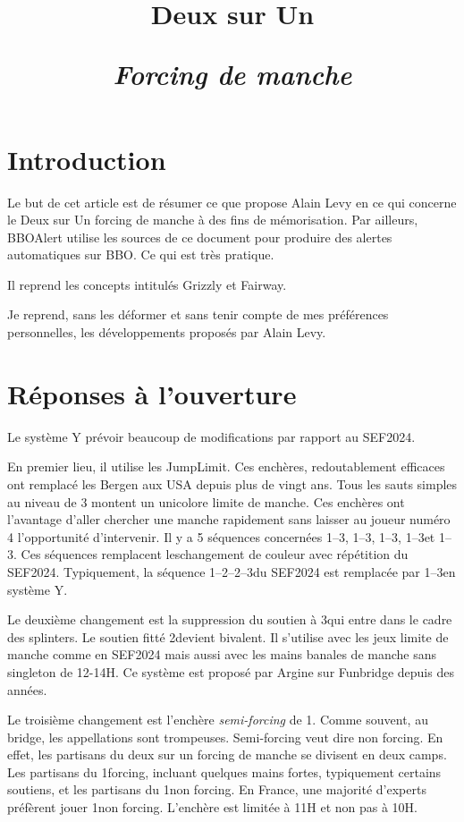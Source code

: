 \documentclass[a4paper,12pt, french, twocolumn]{article}
\title{Deux sur Un\par \textit{Forcing de manche}}
\date{}
\author{}
\newcommand{\T}{\Cl}
\newcommand{\K}{\Di}
\newcommand{\C}{\He}
\renewcommand{\P}{\Sp}
\begin{document}
\maketitle




\section*{Introduction}
Le but de cet article est de résumer ce que propose Alain Levy en ce qui concerne le Deux sur Un forcing de manche à des fins de mémorisation.
Par ailleurs, BBOAlert utilise les sources de ce document pour produire des alertes automatiques sur BBO. Ce qui est très pratique.

Il reprend les concepts intitulés Grizzly et Fairway.

Je reprend, sans les déformer et sans tenir compte de mes préférences personnelles, les développements proposés par Alain Levy.


\section*{Réponses à l'ouverture}

Le système Y prévoir beaucoup de modifications par rapport au SEF2024.

En premier lieu, il utilise les JumpLimit. Ces enchères, redoutablement efficaces ont remplacé les Bergen aux USA depuis plus de vingt ans. Tous les sauts simples au niveau de 3 montent un unicolore limite de manche. Ces enchères ont l'avantage d'aller chercher une manche rapidement sans laisser au joueur numéro 4 l'opportunité d'intervenir. Il y a 5 séquences concernées 1\C--3\T, 1\C--3\K, 1\P--3\T, 1\P--3\K et 1\P--3\C. Ces séquences remplacent leschangement de couleur avec répétition du SEF2024. Typiquement, la séquence 1\P--2\T--2\P--3\T du SEF2024 est remplacée par 1\P--3\T en système Y.

Le deuxième changement est la suppression du soutien à 3\NT qui entre dans le cadre des splinters. Le soutien fitté 2\NT devient bivalent. Il s'utilise avec les jeux limite de manche comme en SEF2024 mais aussi avec les mains banales de manche sans singleton de 12-14H. Ce système est proposé par Argine sur Funbridge depuis des années.

Le troisième changement est l'enchère \textit{semi-forcing }de 1\NT. Comme souvent, au bridge, les appellations sont trompeuses. Semi-forcing veut dire non forcing. En effet, les partisans du deux sur un forcing de manche se divisent en deux camps. Les partisans du 1\NT forcing, incluant quelques mains fortes, typiquement certains soutiens, et les partisans du 1\NT non forcing. En France, une majorité d'experts préfèrent jouer 1\NT non forcing. L'enchère est limitée à 11H et non pas à 10H.
\end{document}
